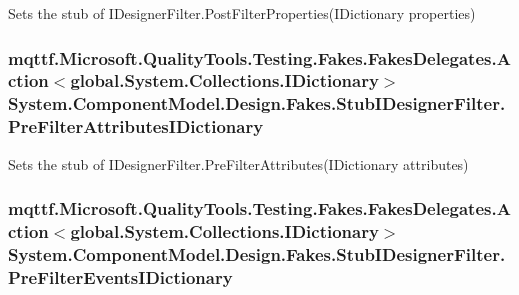 Sets the stub of I\-Designer\-Filter.\-Post\-Filter\-Properties(\-I\-Dictionary properties)

\hypertarget{class_system_1_1_component_model_1_1_design_1_1_fakes_1_1_stub_i_designer_filter_a579a0e01fe444bf4df97dc2c944204da}{
\subsubsection[{Pre\-Filter\-Attributes\-I\-Dictionary}]{\setlength{\rightskip}{0pt plus 5cm}mqttf.\-Microsoft.\-Quality\-Tools.\-Testing.\-Fakes.\-Fakes\-Delegates.\-Action$<$global.\-System.\-Collections.\-I\-Dictionary$>$ System.\-Component\-Model.\-Design.\-Fakes.\-Stub\-I\-Designer\-Filter.\-Pre\-Filter\-Attributes\-I\-Dictionary}}\label{class_system_1_1_component_model_1_1_design_1_1_fakes_1_1_stub_i_designer_filter_a579a0e01fe444bf4df97dc2c944204da}


Sets the stub of I\-Designer\-Filter.\-Pre\-Filter\-Attributes(\-I\-Dictionary attributes)

\hypertarget{class_system_1_1_component_model_1_1_design_1_1_fakes_1_1_stub_i_designer_filter_a3bbfd357d732c4d2582deb1264f0296c}{
\subsubsection[{Pre\-Filter\-Events\-I\-Dictionary}]{\setlength{\rightskip}{0pt plus 5cm}mqttf.\-Microsoft.\-Quality\-Tools.\-Testing.\-Fakes.\-Fakes\-Delegates.\-Action$<$global.\-System.\-Collections.\-I\-Dictionary$>$ System.\-Component\-Model.\-Design.\-Fakes.\-Stub\-I\-Designer\-Filter.\-Pre\-Filter\-Events\-I\-Dictionary}}\label{class_system_1_1_component_model_1_1_design_1_1_fakes_1_1_stub_i_designer_filter_a3bbfd357d732c4d2582deb1264f0296c}



